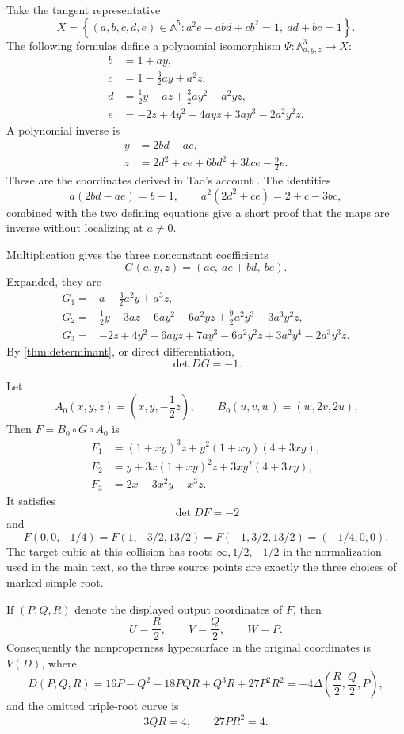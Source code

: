 \documentclass[11pt,reqno]{amsart}
\theoremstyle{definition}
\theoremstyle{remark}
\newcommand{\A}{\mathbb A}
\newcommand{\set}[1]{\left\{#1\right\}}
\begin{document}
Take the tangent representative
\[
 X=\set{(a,b,c,d,e)\in\A^5:
 a^2e-abd+cb^2=1,\ ad+bc=1}.
\]
The following formulas define a polynomial isomorphism
$\Psi:\A^3_{a,y,z}\to X$:
\begin{align*}
 b&=1+ay,\\
 c&=1-\frac32ay+a^2z,\\
 d&=\frac12y-az+\frac32ay^2-a^2yz,\\
 e&=-2z+4y^2-4ayz+3ay^3-2a^2y^2z.
\end{align*}
A polynomial inverse is
\begin{align*}
 y&=2bd-ae,\\
 z&=2d^2+ce+6bd^2+3bce-\frac92e.
\end{align*}
These are the coordinates derived in Tao's account
\cite{TaoDigestion}.  The identities
\[
 a(2bd-ae)=b-1,
 \qquad
 a^2(2d^2+ce)=2+c-3bc,
\]
combined with the two defining equations give a short proof that the
maps are inverse without localizing at $a\ne0$.

Multiplication gives the three nonconstant coefficients
\[
 G(a,y,z)=(ac,\ ae+bd,\ be).
\]
Expanded, they are
\begin{align*}
 G_1={}&a-\frac32a^2y+a^3z,\\
 G_2={}&\frac12y-3az+6ay^2-6a^2yz
 +\frac92a^2y^3-3a^3y^2z,\\
 G_3={}&-2z+4y^2-6ayz+7ay^3
 -6a^2y^2z+3a^2y^4-2a^3y^3z.
\end{align*}
By \cref{thm:determinant}, or direct differentiation,
\[
 \det DG=-1.
\]

Let
\[
 A_0(x,y,z)=\left(x,y,-\frac12z\right),
 \qquad
 B_0(u,v,w)=(w,2v,2u).
\]
Then $F=B_0\circ G\circ A_0$ is
\begin{align*}
 F_1&=(1+xy)^3z+y^2(1+xy)(4+3xy),\\
 F_2&=y+3x(1+xy)^2z+3xy^2(4+3xy),\\
 F_3&=2x-3x^2y-x^3z.
\end{align*}
It satisfies
\[
 \det DF=-2
\]
and
\[
 F(0,0,-1/4)
 =F(1,-3/2,13/2)
 =F(-1,3/2,13/2)
 =(-1/4,0,0).
\]
The target cubic at this collision has roots
$\infty,1/2,-1/2$ in the normalization used in the main text, so the
three source points are exactly the three choices of marked simple root.

If $(P,Q,R)$ denote the displayed output coordinates of $F$, then
\[
 U=\frac R2,\qquad V=\frac Q2,\qquad W=P.
\]
Consequently the nonproperness hypersurface in the original coordinates
is $V(D)$, where
\[
 D(P,Q,R)=16P-Q^2-18PQR+Q^3R+27P^2R^2
 =-4\Delta\left(\frac R2,\frac Q2,P\right),
\]
and the omitted triple-root curve is
\[
 3QR=4,\qquad27PR^2=4.
\]
\end{document}
